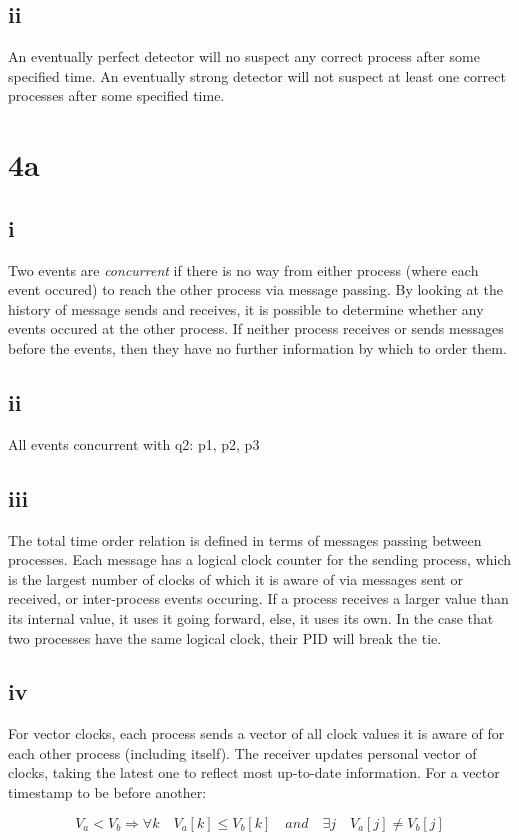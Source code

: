 \documentclass[a4paper,10pt,]{report}
\begin{document}
\subsection{ii}
An eventually perfect detector will no suspect any correct process after some specified time.  An eventually strong detector will not suspect at least one correct processes after some specified time.

\section{4a}
\subsection{i}
Two events are \emph{concurrent} if there is no way from either process (where each event occured) to reach the other process via message passing.  By looking at the history of message sends and receives, it is possible to determine whether any events occured at the other process.  If neither process receives or sends messages before the events, then they have no further information by which to order them.
\subsection{ii}
All events concurrent with q2: p1, p2, p3
\subsection{iii}
The total time order relation is defined in terms of messages passing between processes.  Each message has a logical clock counter for the sending process, which is the largest number of clocks of which it is aware of via messages sent or received, or inter-process events occuring.  If a process receives a larger value than its internal value, it uses it going forward, else, it uses its own.  In the case that two processes have the same logical clock, their PID will break the tie.
\subsection{iv}
For vector clocks, each process sends a vector of all clock values it is aware of for each other process (including itself).  The receiver updates personal vector of clocks, taking the latest one to reflect most up-to-date information.  For a vector timestamp to be before another:

\[V_a < V_b \Rightarrow \forall k\quad V_a[k] \leq V_b[k] \quad and \quad \exists j\quad V_a[j]\neq V_b[j] \]
\end{document}
